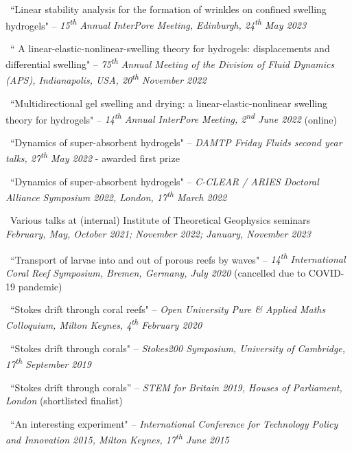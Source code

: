 \documentclass[a4paper]{article}
\begin{document}
\begin{multicols}{2}
\begin{small}
\begin{itemize}
                    \item \faVolumeUp \, ``Linear stability analysis for the formation of wrinkles on confined swelling hydrogels" -- \emph{15\textsuperscript{th} Annual InterPore Meeting, Edinburgh, 24\textsuperscript{th} May 2023}
                    \item \faVolumeUp \, `` A linear-elastic-nonlinear-swelling theory for hydrogels: displacements and differential swelling" -- \emph{75\textsuperscript{th} Annual Meeting of the Division of Fluid Dynamics (APS), Indianapolis, USA, 20\textsuperscript{th} November 2022}
                    \item \faVolumeUp \, ``Multidirectional gel swelling and drying: a linear-elastic-nonlinear swelling theory for hydrogels" -- \emph{14\textsuperscript{th} Annual InterPore Meeting, 2\textsuperscript{nd} June 2022} (online)
                    \item \faVolumeUp \, ``Dynamics of super-absorbent hydrogels" -- \emph{DAMTP Friday Fluids second year talks, 27\textsuperscript{th} May 2022} - awarded first prize
                    \item \faClipboard \, ``Dynamics of super-absorbent hydrogels" -- \emph{C-CLEAR / ARIES Doctoral Alliance Symposium 2022, London, 17\textsuperscript{th} March 2022}
                    \item \faVolumeUp \, Various talks at (internal) Institute of Theoretical Geophysics seminars \emph{February, May, October 2021; November 2022; January, November 2023}
                    {\color{gray}\item \faVolumeUp \, ``Transport of larvae into and out of porous reefs by waves" -- \emph{14\textsuperscript{th} International Coral Reef Symposium, Bremen, Germany, July 2020} (cancelled due to COVID-19 pandemic)}
                    \item \faVolumeUp \, ``Stokes drift through coral reefs" -- \emph{Open University Pure \& Applied Maths Colloquium, Milton Keynes, 4\textsuperscript{th} February 2020}
                    \item \faVolumeUp \, ``Stokes drift through corals" -- \emph{Stokes200 Symposium, University of Cambridge, 17\textsuperscript{th} September 2019}
                    \item \faClipboard \, ``Stokes drift through corals'' -- \emph{STEM for Britain 2019, Houses of Parliament, London} (shortlisted finalist)
                    \item \faVolumeUp \, ``An interesting experiment" -- \emph{International Conference for Technology Policy and Innovation 2015,  Milton Keynes, 17\textsuperscript{th} June 2015}
                \end{itemize}
            \end{small}
        
    \end{multicols}
\end{document}
